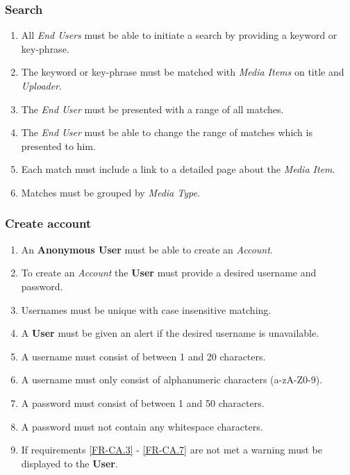 

%

\label{sec:Functional Requirements}


\subsubsection {Search}

\begin{enumerate}[label=\textbf{FR-\twodigits*}]

	\item All \textit{End Users} must be able to initiate a search by providing a keyword or key-phrase.
	\item The keyword or key-phrase must be matched with \textit{Media Items} on title and \textit{Uploader}.
	\item The \textit{End User} must be presented with a range of all matches.
	\item The \textit{End User} must be able to change the range of matches which is presented to him.
	\item Each match must include a link to a detailed page about the \textit{Media Item}.
	\item Matches must be grouped by \textit{Media Type}. 
\end{enumerate}	
			
\subsubsection{Create account}

\begin{enumerate}[label=\textbf{FR-\twodigits*}, resume]
	\item An \textbf{Anonymous User} must be able to create an \textit{Account}.
	\item To create an \textit{Account} the \textbf{User} must provide a desired username and password.
	\item Usernames must be unique with case insensitive matching. \label{FR-CA.3}
	\item A \textbf{User} must be given an alert if the desired username is unavailable.
	\item A username must consist of between 1 and 20 characters.
	\item A username must only consist of alphanumeric characters (a-zA-Z0-9).
	\item A password must consist of between 1 and 50 characters. 
	\label{FR-CA.6}
	\item A password must not contain any whitespace characters. \label{FR-CA.7}
	\item If requirements \ref{FR-CA.3} - \ref{FR-CA.7} are not met a warning must be displayed to the \textbf{User}.
\end{enumerate}
	
